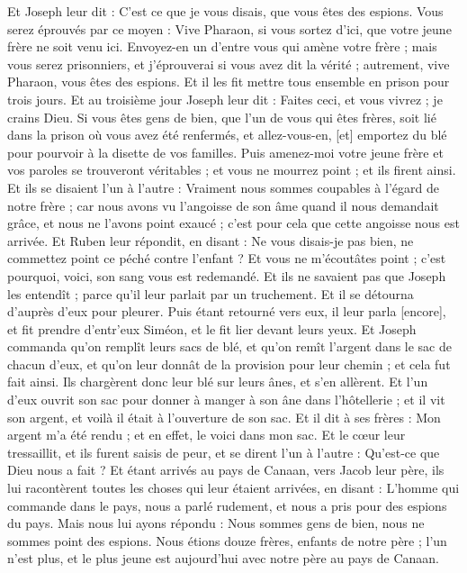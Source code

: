 \begin{multicols}{2}
Et Joseph leur dit : C'est ce que je vous disais, que vous êtes des espions.
Vous serez éprouvés par ce moyen : Vive Pharaon, si vous sortez d'ici, que votre jeune frère ne soit venu ici.
Envoyez-en un d'entre vous qui amène votre frère ; mais vous serez prisonniers, et j'éprouverai si vous avez dit la vérité ; autrement, vive Pharaon, vous êtes des espions.
Et il les fit mettre tous ensemble en prison pour trois jours.
Et au troisième jour Joseph leur dit : Faites ceci, et vous vivrez ; je crains Dieu.
Si vous êtes gens de bien, que l'un de vous qui êtes frères, soit lié dans la prison où vous avez été renfermés, et allez-vous-en, [et] emportez du blé pour pourvoir à la disette de vos familles.
Puis amenez-moi votre jeune frère et vos paroles se trouveront véritables ; et vous ne mourrez point ; et ils firent ainsi.
Et ils se disaient l'un à l'autre : Vraiment nous sommes coupables à l'égard de notre frère ; car nous avons vu l'angoisse de son âme quand il nous demandait grâce, et nous ne l'avons point exaucé ; c'est pour cela que cette angoisse nous est arrivée.
Et Ruben leur répondit, en disant : Ne vous disais-je pas bien, ne commettez point ce péché contre l'enfant ? Et vous ne m'écoutâtes point ; c'est pourquoi, voici, son sang vous est redemandé.
Et ils ne savaient pas que Joseph les entendît ; parce qu'il leur parlait par un truchement.
Et il se détourna d'auprès d'eux pour pleurer. Puis étant retourné vers eux, il leur parla [encore], et fit prendre d'entr'eux Siméon, et le fit lier devant leurs yeux.
Et Joseph commanda qu'on remplît leurs sacs de blé, et qu'on remît l'argent dans le sac de chacun d'eux, et qu'on leur donnât de la provision pour leur chemin ; et cela fut fait ainsi.
Ils chargèrent donc leur blé sur leurs ânes, et s'en allèrent.
Et l'un d'eux ouvrit son sac pour donner à manger à son âne dans l'hôtellerie ; et il vit son argent, et voilà il était à l'ouverture de son sac.
Et il dit à ses frères : Mon argent m'a été rendu ; et en effet, le voici dans mon sac. Et le cœur leur tressaillit, et ils furent saisis de peur, et se dirent l'un à l'autre : Qu'est-ce que Dieu nous a fait ?
Et étant arrivés au pays de Canaan, vers Jacob leur père, ils lui racontèrent toutes les choses qui leur étaient arrivées, en disant :
L'homme qui commande dans le pays, nous a parlé rudement, et nous a pris pour des espions du pays.
Mais nous lui ayons répondu : Nous sommes gens de bien, nous ne sommes point des espions.
Nous étions douze frères, enfants de notre père ; l'un n'est plus, et le plus jeune est aujourd'hui avec notre père au pays de Canaan.

\end{multicols}
